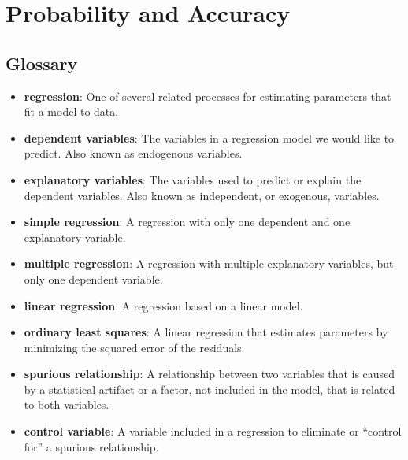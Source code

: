

 \chapter{Probability and Accuracy}  \section*{Glossary} \begin{itemize}
	
	\item {\bf regression}: One of several related processes for estimating parameters
	that fit a model to data.
	
	\item {\bf dependent variables}: The variables in a regression model we would
	like to predict.  Also known as endogenous variables.
	
	\item {\bf explanatory variables}: The variables used to predict or explain
	the dependent variables.  Also known as independent, or exogenous,
	variables.
	
	\item {\bf simple regression}: A regression with only one dependent and
	one explanatory variable.
	
	\item {\bf multiple regression}: A regression with multiple explanatory
	variables, but only one dependent variable.
	
	\item {\bf linear regression}: A regression based on a linear model.
	
	\item {\bf ordinary least squares}: A linear regression that estimates
	parameters by minimizing the squared error of the residuals.
	
	\item {\bf spurious relationship}: A relationship between two variables that is 
	caused by a statistical artifact or a factor, not included in the
	model, that is related to both variables.
	
	\item {\bf control variable}: A variable included in a regression to
	eliminate or ``control for'' a spurious relationship.
	

\end{itemize}
